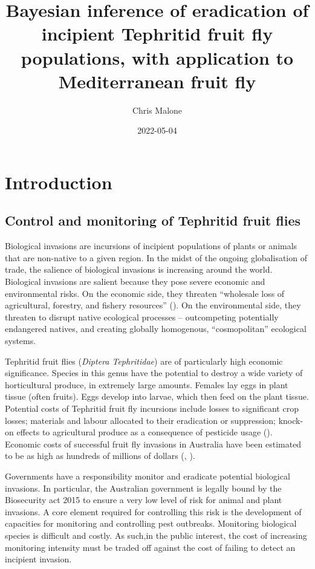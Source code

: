 \documentclass[
]{book}
\title{Bayesian inference of eradication of incipient Tephritid fruit fly populations, with application to Mediterranean fruit fly}
\author{Chris Malone}
\date{2022-05-04}
\begin{document}
\maketitle

\renewcommand{\baselinestretch}{1}\normalsize
\tableofcontents
\renewcommand{\baselinestretch}{2}\normalsize

\hypertarget{introduction}{%
\chapter{Introduction}\label{introduction}}

\hypertarget{control-and-monitoring-of-tephritid-fruit-flies}{%
\section{Control and monitoring of Tephritid fruit flies}\label{control-and-monitoring-of-tephritid-fruit-flies}}

Biological invasions are incursions of incipient populations of plants or animals that are non-native to a given region. In the midst of the ongoing globalisation of trade, the salience of biological invasions is increasing around the world. Biological invasions are salient because they pose severe economic and environmental risks. On the economic side, they threaten ``wholesale loss of agricultural, forestry, and fishery resources'' (\citet{mack2000}). On the environmental side, they threaten to disrupt native ecological processes -- outcompeting potentially endangered natives, and creating globally homogenous, ``cosmopolitan'' ecological systems.

Tephritid fruit flies (\emph{Diptera Tephritidae}) are of particularly high economic significance. Species in this genus have the potential to destroy a wide variety of horticultural produce, in extremely large amounts. Females lay eggs in plant tissue (often fruits). Eggs develop into larvae, which then feed on the plant tissue. Potential costs of Tephritid fruit fly incursions include losses to significant crop losses; materials and labour allocated to their eradication or suppression; knock-on effects to agricultural produce as a consequence of pesticide usage (\citet{suckling2016}). Economic costs of successful fruit fly invasions in Australia have been estimated to be as high as hundreds of millions of dollars (\citet{suckling2016}, \citet{hancock2000}).

Governments have a responsibility monitor and eradicate potential biological invasions. In particular, the Australian government is legally bound by the Biosecurity act 2015 to ensure a very low level of risk for animal and plant invasions. A core element required for controlling this risk is the development of capacities for monitoring and controlling pest outbreaks. Monitoring biological species is difficult and costly. As such,in the public interest, the cost of increasing monitoring intensity must be traded off against the cost of failing to detect an incipient invasion.
\end{document}
